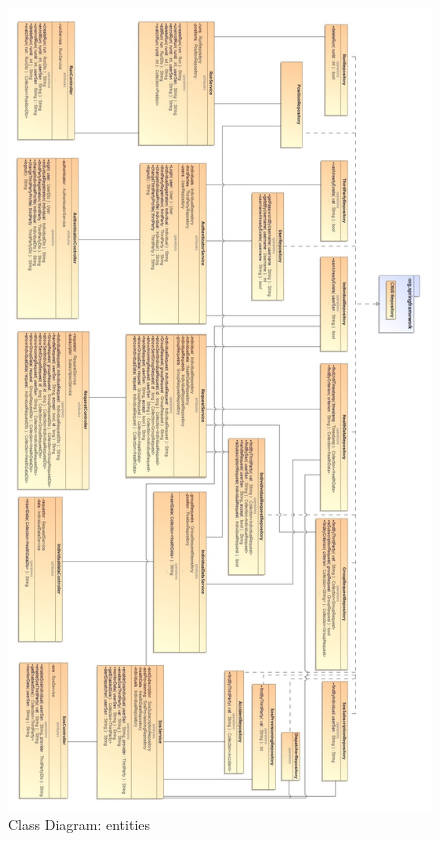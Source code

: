 \documentclass[a4paper]{article}
\begin{document}
\begin{figure}[!htpb]
    \centering
    \includegraphics[width=\textwidth,keepaspectratio]{DD/images/UML/ClassDiagram.jpg}
    \caption{Class Diagram: entities}
    \label{fig:CDentities_trackme}
\end{figure}
    
\newpage
\end{document}
